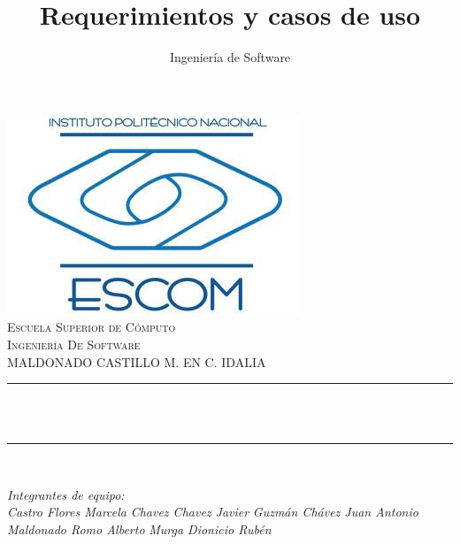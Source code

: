 \documentclass[12pt]{article}
\title{Requerimientos y casos de uso}					%
\author{Ingeniería de Software}					%
\makeatletter
\let\thetitle\@title
\let\theauthor\@author
\makeatother
\begin{document}

\begin{titlepage}
	\centering
    \vspace*{0.0 cm}
    \includegraphics[scale = 0.5]{fotoEscudoESCOM.jpg}\\[.0 cm]	%
    \textsc{\LARGE Escuela Superior de Cómputo}\\[2.0 cm]	%
	\textsc{\Large Ingeniería De Software}\\[0.5 cm]				%
	\textsc{\large  MALDONADO CASTILLO M. EN C. IDALIA}\\[0.5 cm]		%
	\rule{\linewidth}{0.2 mm} \\[0.4 cm]
	{ \huge \bfseries \thetitle}\\
	\rule{\linewidth}{0.2 mm} \\[1.5 cm]
	
	\begin{minipage}{0.4\textwidth}
		\begin{center} \large
			\emph{Integrantes de equipo:}\\
            \emph{Castro Flores Marcela}
	    \emph{Chavez Chavez Javier}
            \emph{Guzmán Chávez Juan Antonio}
            \emph{Maldonado Romo Alberto}
            \emph{Murga Dionicio Rubén}
            \emph{}
			\theauthor\linebreak
			\end{center}
	\end{minipage}\\[2 cm] 
	\vfill
	
\end{titlepage}


\tableofcontents
\pagebreak

\end{document}

